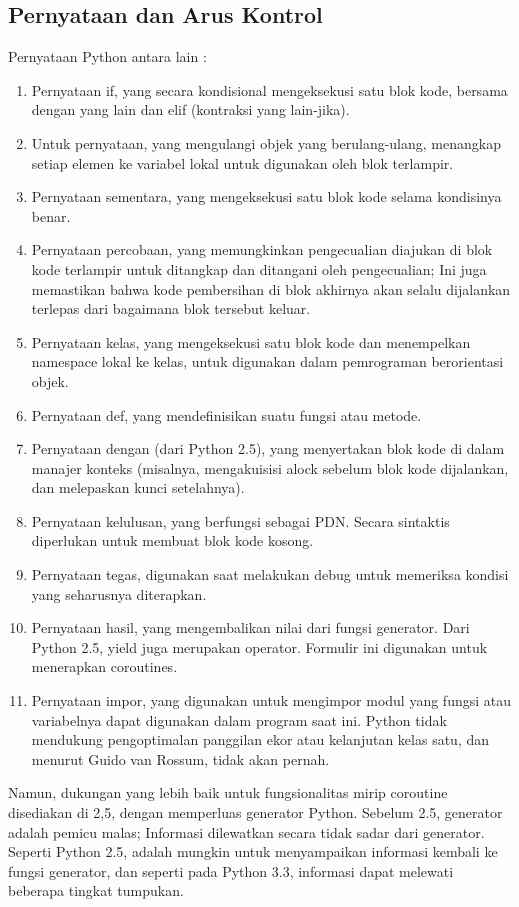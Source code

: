 \subsection {Pernyataan dan Arus Kontrol}
	Pernyataan Python antara lain :

	\begin {enumerate}
	\item
	Pernyataan if, yang secara kondisional mengeksekusi satu blok kode, bersama dengan yang lain dan elif (kontraksi yang lain-jika).
	\item
	Untuk pernyataan, yang mengulangi objek yang berulang-ulang, menangkap setiap elemen ke variabel lokal untuk digunakan oleh blok terlampir.
	\item
	Pernyataan sementara, yang mengeksekusi satu blok kode selama kondisinya benar.
	\item
	Pernyataan percobaan, yang memungkinkan pengecualian diajukan di blok kode terlampir untuk ditangkap dan ditangani oleh pengecualian; Ini juga memastikan bahwa kode pembersihan di blok akhirnya akan selalu dijalankan terlepas dari bagaimana blok tersebut keluar.
	\item
	Pernyataan kelas, yang mengeksekusi satu blok kode dan menempelkan namespace lokal ke kelas, untuk digunakan dalam pemrograman berorientasi objek.
	\item
	Pernyataan def, yang mendefinisikan suatu fungsi atau metode.
	\item
	Pernyataan dengan (dari Python 2.5), yang menyertakan blok kode di dalam manajer konteks (misalnya, mengakuisisi alock sebelum blok kode dijalankan, dan melepaskan kunci setelahnya).
	\item
	Pernyataan kelulusan, yang berfungsi sebagai PDN. Secara sintaktis diperlukan untuk membuat blok kode kosong.
	\item
	Pernyataan tegas, digunakan saat melakukan debug untuk memeriksa kondisi yang seharusnya diterapkan.
	\item
	Pernyataan hasil, yang mengembalikan nilai dari fungsi generator. Dari Python 2.5, yield juga merupakan operator. Formulir ini digunakan untuk menerapkan coroutines.
	\item
	Pernyataan impor, yang digunakan untuk mengimpor modul yang fungsi atau variabelnya dapat digunakan dalam program saat ini.
	Python tidak mendukung pengoptimalan panggilan ekor atau kelanjutan kelas satu, dan menurut Guido van Rossum, tidak akan pernah. 
	\end {enumerate}
	Namun, dukungan yang lebih baik untuk fungsionalitas mirip coroutine disediakan di 2,5, dengan memperluas generator Python. 
	Sebelum 2.5, generator adalah pemicu malas; Informasi dilewatkan secara tidak sadar dari generator. Seperti Python 2.5, adalah mungkin 
	untuk menyampaikan informasi kembali ke fungsi generator, dan seperti pada Python 3.3, informasi dapat melewati beberapa tingkat tumpukan.

